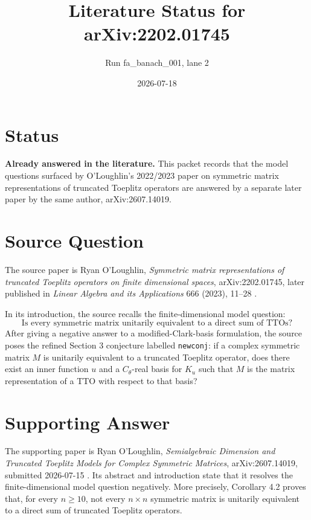 \documentclass[11pt]{article}
\title{Literature Status for arXiv:2202.01745}
\author{Run fa\_banach\_001, lane 2}
\date{2026-07-18}
\begin{document}
\maketitle

\section*{Status}

\textbf{Already answered in the literature.} This packet records that the model
questions surfaced by O'Loughlin's 2022/2023 paper on symmetric matrix
representations of truncated Toeplitz operators are answered by a separate later
paper by the same author, arXiv:2607.14019.

\section*{Source Question}

The source paper is Ryan O'Loughlin, \emph{Symmetric matrix representations of
truncated Toeplitz operators on finite dimensional spaces}, arXiv:2202.01745,
later published in \emph{Linear Algebra and its Applications} 666 (2023),
11--28 \cite{oloughlin2023}.

In its introduction, the source recalls the finite-dimensional model question:
\[
\text{Is every symmetric matrix unitarily equivalent to a direct sum of TTOs?}
\]
After giving a negative answer to a modified-Clark-basis formulation, the source
poses the refined Section 3 conjecture labelled \texttt{newconj}: if a complex
symmetric matrix \(M\) is unitarily equivalent to a truncated Toeplitz operator,
does there exist an inner function \(u\) and a \(C_\theta\)-real basis for
\(K_u\) such that \(M\) is the matrix representation of a TTO with respect to
that basis?

\section*{Supporting Answer}

The supporting paper is Ryan O'Loughlin, \emph{Semialgebraic Dimension and
Truncated Toeplitz Models for Complex Symmetric Matrices}, arXiv:2607.14019,
submitted 2026-07-15 \cite{oloughlin2026}. Its abstract and introduction state
that it resolves the finite-dimensional model question negatively. More
precisely, Corollary 4.2 proves that, for every \(n\geq 10\), not every
\(n\times n\) symmetric matrix is unitarily equivalent to a direct sum of
truncated Toeplitz operators.
\end{document}
